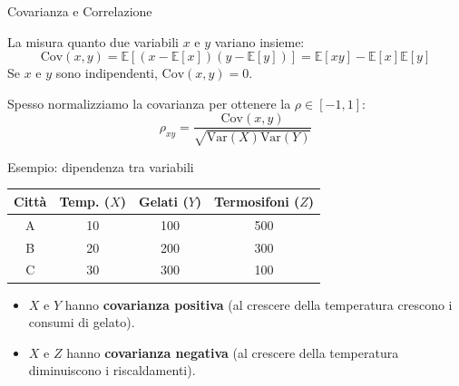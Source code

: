 \documentclass[12pt,aspectratio=169]{beamer}
\begin{document}
\begin{frame}{Covarianza e Correlazione}

	La  misura quanto due variabili $x$ e $y$ variano insieme:
	\begin{equation}
		\text{Cov}(x, y) = \mathbb{E}\left[(x - \mathbb{E}[x])(y - \mathbb{E}[y])\right] = \mathbb{E}[xy] - \mathbb{E}[x]\mathbb{E}[y]
	\end{equation}
	Se $x$ e $y$ sono indipendenti, $\text{Cov}(x, y) = 0$.

	Spesso normalizziamo la covarianza per ottenere la  $\rho \in [-1, 1]$:
	\begin{equation*}
		\rho_{xy} = \frac{\text{Cov}(x, y)}{\sqrt{\text{Var}(X)\text{Var}(Y)}}
	\end{equation*}

\end{frame}

\begin{frame}{Esempio: dipendenza tra variabili}

	\begin{center}
		\small
		\begin{tabular}{cccc}
			\toprule
			Città & Temp. ($X$) & Gelati ($Y$) & Termosifoni ($Z$) \\
			\midrule
			A     & 10          & 100          & 500               \\
			B     & 20          & 200          & 300               \\
			C     & 30          & 300          & 100               \\
			\bottomrule
		\end{tabular}
	\end{center}

	\begin{itemize}
		\item $X$ e $Y$ hanno \textbf{covarianza positiva} (al crescere della temperatura crescono i consumi di gelato).
		\item $X$ e $Z$ hanno \textbf{covarianza negativa} (al crescere della temperatura diminuiscono i riscaldamenti).
	\end{itemize}

\end{frame}
\end{document}
